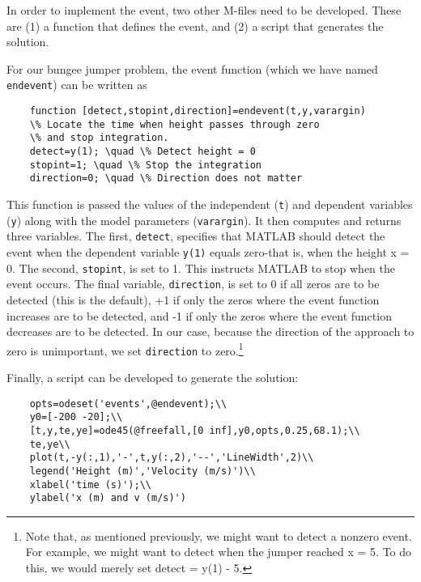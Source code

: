 \documentclass[../main.tex]{subfiles}
\begin{document}
\noindent In order to implement the event, two other M-files need to be developed. These are (1) a function that defines the event, and (2) a script that generates the solution.

For our bungee jumper problem, the event function (which we have named \texttt{endevent}) can be written as
\begin{lstlisting}
    function [detect,stopint,direction]=endevent(t,y,varargin)
    \% Locate the time when height passes through zero
    \% and stop integration.
    detect=y(1); \quad \% Detect height = 0
    stopint=1; \quad \% Stop the integration
    direction=0; \quad \% Direction does not matter
\end{lstlisting}


\noindent This function is passed the values of the independent (\texttt{t}) and dependent variables (\texttt{y}) along
with the model parameters (\texttt{varargin}). It then computes and returns three variables.
The first, \texttt{detect}, specifies that MATLAB should detect the event when the dependent
variable \texttt{y(1)} equals zero-that is, when the height x = 0. The second, \texttt{stopint}, is set to 1.
This instructs MATLAB to stop when the event occurs. The final variable, \texttt{direction}, is set to 0 if all zeros are to be detected (this is the default), +1 if only the zeros where the
event function increases are to be detected, and -1 if only the zeros where the event function decreases are to be detected. In our case, because the direction of the approach to zero
is unimportant, we set \texttt{direction} to zero.\footnote[1]{Note that, as mentioned previously, we might want to detect a nonzero event. For example, we might want to
detect when the jumper reached x = 5. To do this, we would merely set detect = y(1) - 5.}

Finally, a script can be developed to generate the solution:
\begin{lstlisting}
    opts=odeset('events',@endevent);\\
    y0=[-200 -20];\\
    [t,y,te,ye]=ode45(@freefall,[0 inf],y0,opts,0.25,68.1);\\
    te,ye\\
    plot(t,-y(:,1),'-',t,y(:,2),'--','LineWidth',2)\\
    legend('Height (m)','Velocity (m/s)')\\
    xlabel('time (s)');\\
    ylabel('x (m) and v (m/s)')
\end{lstlisting}
\end{document}
